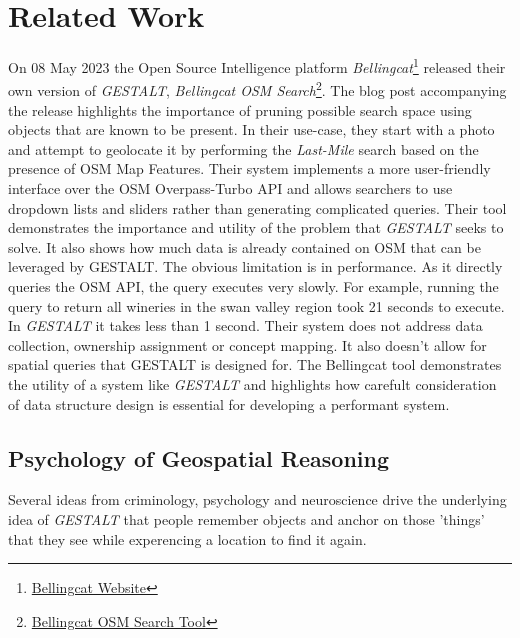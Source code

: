 \section{Related Work}
\label{section:related}


On 08 May 2023 the Open Source Intelligence platform \textit{Bellingcat}\footnote{\href{https://www.bellingcat.com/about/who-we-are/}{Bellingcat Website}} released their own version of \textit{GESTALT}, \textit{Bellingcat OSM Search}\footnote{\href{https://osm-search.bellingcat.com/}{Bellingcat OSM Search Tool}}\cite{Williams2023}. 
The blog post accompanying the release highlights the importance of pruning possible search space using objects that are known to be present. 
In their use-case, they start with a photo and attempt to geolocate it by performing the \textit{Last-Mile} search based on the presence of OSM Map Features. Their system implements a more user-friendly interface over the OSM Overpass-Turbo API and allows searchers to use dropdown lists and sliders rather than generating complicated queries. 
Their tool demonstrates the importance and utility of the problem that \textit{GESTALT} seeks to solve. It also shows how much data is already contained on OSM that can be leveraged by GESTALT. The obvious limitation is in performance. As it directly queries the OSM API, the query executes very slowly. For example, running the query to return all wineries in the swan valley region took 21 seconds to execute. In \textit{GESTALT} it takes less than 1 second. 
Their system does not address data collection, ownership assignment or concept mapping. It also doesn't allow for spatial queries that GESTALT is designed for. 
The Bellingcat tool demonstrates the utility of a system like \textit{GESTALT} and highlights how carefult consideration of data structure design is essential for developing a performant system. 


\subsection{Psychology of Geospatial Reasoning}
Several ideas from criminology, psychology and neuroscience drive the underlying idea of \textit{GESTALT} that people remember objects and anchor on those 'things' that they see while experencing a location to find it again. 

